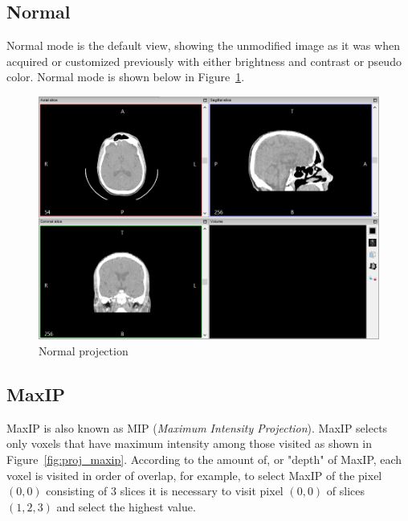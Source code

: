 \subsection{Normal}

Normal mode is the default view, showing the unmodified image as it was when acquired or customized previously with either brightness and contrast or pseudo color. Normal mode is shown below in Figure~\ref{fig:proj_normal}.

\begin{figure}[!h]
\centering
\includegraphics[scale=0.40]{../user_guide_figures/invesalius_screen/multiplanar_window_en.png}
\caption{Normal projection}
\label{fig:proj_normal}
\end{figure}

\subsection{MaxIP}
\label{sec:max_ip}

MaxIP is also known as MIP (\textit{Maximum Intensity Projection}). MaxIP selects only voxels that have maximum intensity among those visited as shown in Figure~\ref{fig:proj_maxip}. According to the amount of, or "depth" of MaxIP, each voxel is visited in order of overlap, for example, to select MaxIP of the pixel $(0, 0)$ consisting of 3 slices it is necessary to visit pixel $(0, 0)$ of slices $(1, 2, 3)$ and select the highest value.

